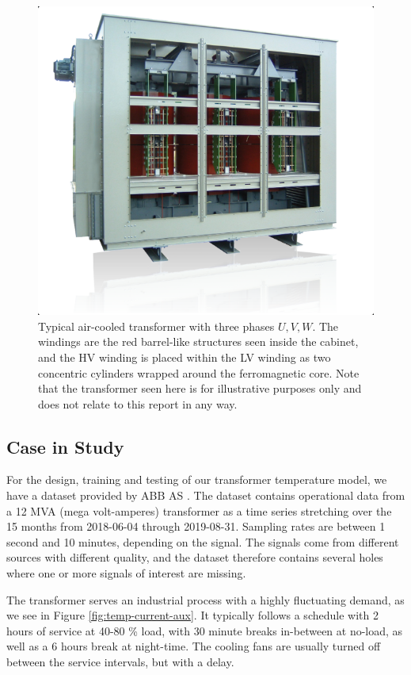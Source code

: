 \documentclass[]{article}
\begin{document}
\begin{figure}[!h]
	\centering
	\includegraphics[width=1\linewidth]{./figs/dry-transformer.png}
	\caption{Typical air-cooled transformer with three phases $U, V, W$. The windings are the red barrel-like structures seen inside the cabinet, and the HV winding is placed within the LV winding as two concentric cylinders wrapped around the ferromagnetic core. Note that the transformer seen here is for illustrative purposes only and does not relate to this report in any way.}
	\label{fig:dry-transformer}
\end{figure}

\subsection{Case in Study} \label{sec:case-description}
For the design, training and testing of our transformer temperature model, we have a dataset provided by ABB AS \cite{abb-url}. The dataset contains operational data from a 12 MVA (mega volt-amperes) transformer as a time series stretching over the 15 months from 2018-06-04 through 2019-08-31. Sampling rates are between 1 second and 10 minutes, depending on the signal. The signals come from different sources with different quality, and the dataset therefore contains several holes where one or more signals of interest are missing.

The transformer serves an industrial process with a highly fluctuating demand, as we see in Figure \ref{fig:temp-current-aux}. It typically follows a schedule with 2 hours of service at 40-80 \% load, with 30 minute breaks in-between at no-load, as well as a 6 hours break at night-time. The cooling fans are usually turned off between the service intervals, but with a delay.
\end{document}
